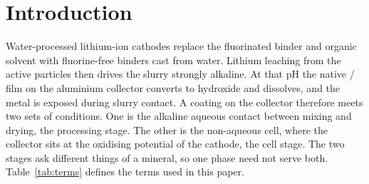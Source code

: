 \section{Introduction}\label{sec:introduction}

Water-processed lithium-ion cathodes replace the fluorinated binder and organic solvent with fluorine-free binders cast from water\cite{heidbuchel2022enabling}. %
Lithium leaching from the active particles then drives the slurry strongly alkaline\cite{hawley2020lithium,bauer2019effects}. %
At that pH the native / film on the aluminium collector converts to hydroxide and dissolves, and the metal is exposed during slurry contact\cite{heidbuchel2022enabling,li2016effect}. %
A coating on the collector therefore meets two sets of conditions. %
One is the alkaline aqueous contact between mixing and drying, the processing stage. %
The other is the non-aqueous cell, where the collector sits at the oxidising potential of the cathode, the cell stage. %
The two stages ask different things of a mineral, so one phase need not serve both. %
Table~\ref{tab:terms} defines the terms used in this paper. %

